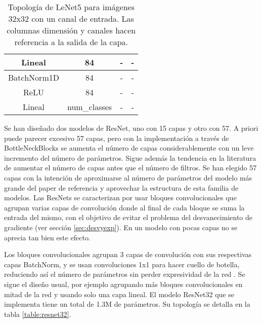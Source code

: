 \begin{table}[]
\begin{tabular}{|c|c|c|c|}
Lineal                         & 84                                  & -                                & -                                 \\ \hline
BatchNorm1D                    & 84                                  & -                                & -                                 \\ \hline
ReLU                           & 84                                  & -                                & -                                 \\ \hline
Lineal                         & num\_classes                        & -                                & -                                 \\ \hline
\end{tabular}
\caption{Topología de LeNet5 para imágenes 32x32 con un canal de entrada. Las columnas dimensión y canales hacen referencia a la salida de la capa.}
\label{table:lenet5}
\end{table}


Se han diseñado dos modelos de ResNet, uno con 15 capas y otro con 57. A priori puede parecer excesivo 57 capas, pero con la implementación a través de BottleNeckBlocks se aumenta el número de capas considerablemente con un leve incremento del número de parámetros. Sigue además la tendencia en la literatura de aumentar el número de capas antes que el número de filtros. Se han elegido 57 capas con la intención de aproximarse al número de parámetros del modelo más grande del paper de referencia y aprovechar la estructura de esta familia de modelos. Las ResNets\cite{ResNets} se caracterizan por usar bloques convolucionales que agrupan varias capas de convolución donde al final de cada bloque se suma la entrada del mismo, con el objetivo de evitar el problema del desvanecimiento de gradiente (ver sección \ref{sec:desvyexp}). En un modelo con pocas capas no se aprecia tan bien este efecto.

Los bloques convolucionales agrupan 3 capas de convolución con sus respectivas capas BatchNorm, y se usan convoluciones 1x1 para hacer cuello de botella, reduciendo así el número de parámetros sin perder expresividad de la red \cite{bottleorig, bottlegoogle}. Se sigue el diseño usual, por ejemplo agrupando más bloques convolucionales en mitad de la red y usando solo una capa lineal. El modelo ResNet32 que se implementa tiene un total de 1.3M de parámetros. Su topología se detalla en la tabla \ref{table:resnet32}.


